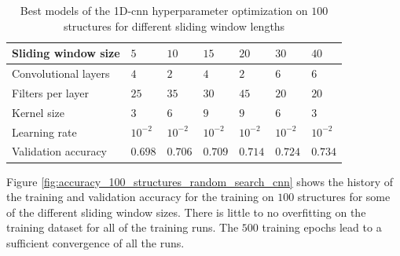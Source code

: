 \documentclass[conference]{IEEEtran}
\begin{document}
\begin{table}[htp]
	\centering
	\caption{Best models of the 1D-\gls{cnn} hyperparameter optimization on $ 100 $ structures for different sliding window lengths}
	\label{tab:hyperparameters_100_structures_cnn}
	\setlength{\tabcolsep}{3pt} %
	\begin{tabular}{l|llllll}
		Sliding window size & $ 5 $ & $ 10 $ & $ 15 $ & $ 20 $ & $ 30 $ & $ 40 $ \\
		\hline
		Convolutional layers & $ 4 $ & $ 2 $ & $ 4 $ & $ 2 $ & $ 6 $ & $ 6 $ \\
		Filters per layer & $ 25 $ & $ 35 $ & $ 30 $ & $ 45 $ & $ 20 $ & $ 20 $ \\
		Kernel size & $ 3 $ & $ 6 $ & $ 9 $ & $ 9 $ & $ 6 $ & $ 3 $ \\
		Learning rate & $ 10^{-2} $ & $ 10^{-2} $ & $ 10^{-2} $ & $ 10^{-2} $ & $ 10^{-2} $ & $ 10^{-2} $ \\
		\hline
		Validation accuracy & $ 0.698 $ & $ 0.706 $ & $ 0.709 $ & $ 0.714 $ & $ 0.724 $ & $ 0.734 $
	\end{tabular}
\end{table}

Figure \ref{fig:accuracy_100_structures_random_search_cnn} shows the history of the training and validation accuracy for the training on $ 100 $ structures for some of the different sliding window sizes. There is little to no overfitting on the training dataset for all of the training runs. The $ 500 $ training epochs lead to a sufficient convergence of all the runs.
\end{document}
